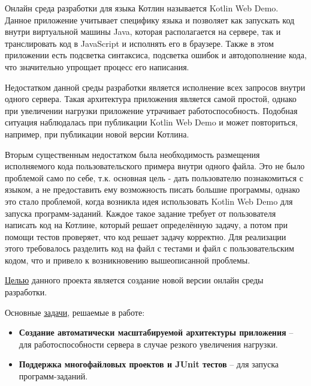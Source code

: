 	Онлайн среда разработки для языка Котлин называется Kotlin Web Demo. Данное приложение учитывает специфику  языка и позволяет как запускать код внутри виртуальной машины Java, которая располагается на сервере, так и транслировать код в JavaScript и исполнять его в браузере. Также в этом приложении есть подсветка синтаксиса, подсветка ошибок и автодополнение кода, что значительно упрощает процесс его написания.
	
	Недостатком данной среды разработки является исполнение всех запросов внутри одного сервера. Такая архитектура приложения является самой простой, однако при увеличении нагрузки приложение утрачивает работоспособность. Подобная ситуация наблюдалась при публикации Kotlin Web Demo и может повториться, например, при публикации новой версии Котлина.
	
	
	Вторым существенным недостатком была необходимость размещения  исполняемого кода  пользовательского примера внутри одного файла. Это не было проблемой само по себе, т.к. основная цель - дать пользователю познакомиться с языком, а не предоставить ему возможность писать большие программы, однако это стало проблемой, когда возникла идея использовать Kotlin Web Demo для запуска программ-заданий. Каждое такое задание требует от пользователя написать код на Котлине, который решает определённую задачу, а потом при помощи тестов проверяет, что код решает задачу корректно. Для реализации этого требовалось разделить код на файл с тестами и файл с пользовательским кодом, что и привело к возникновению вышеописанной проблемы.
	
	
	\underline{Целью} данного проекта является создание новой версии онлайн среды разработки.
	
	Основные \underline{задачи}, решаемые в работе:
	\begin{itemize}
		\item { \bf Создание автоматически масштабируемой архитектуры приложения} -- для работоспособности сервера в случае резкого увеличения нагрузки.
		\item { \bf Поддержка многофайловых проектов и JUnit тестов} -- для запуска программ-заданий.
	\end{itemize}
		


